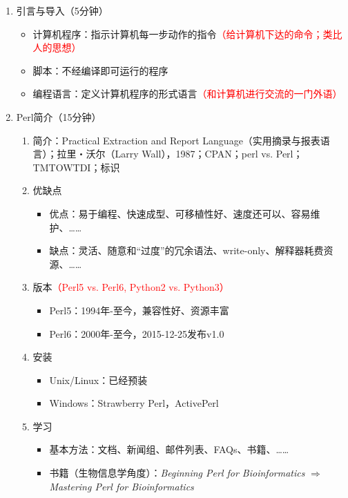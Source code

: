 \documentclass{TIJMUjiaoanLL}
\begin{document}
\begin{enumerate}
  \item 引言与导入（5分钟）
    \begin{itemize}
      \item 计算机程序：指示计算机每一步动作的指令\textcolor{red}{（给计算机下达的命令；类比人的思想）}
      \item 脚本：不经编译即可运行的程序
      \item 编程语言：定义计算机程序的形式语言\textcolor{red}{（和计算机进行交流的一门外语）}
    \end{itemize}
  \item Perl简介（15分钟）
    \begin{enumerate}
      \item 简介：Practical Extraction and Report Language（实用摘录与报表语言）；拉里・沃尔（Larry Wall），1987；CPAN；perl vs. Perl；TMTOWTDI；标识
      \item 优缺点
	\begin{itemize}
	  \item 优点：易于编程、快速成型、可移植性好、速度还可以、容易维护、……
	  \item 缺点：灵活、随意和“过度”的冗余语法、write-only、解释器耗费资源、……
	\end{itemize}
      \item 版本\textcolor{red}{（Perl5 vs. Perl6, Python2 vs. Python3）}
	\begin{itemize}
	  \item Perl5：1994年-至今，兼容性好、资源丰富
	  \item Perl6：2000年-至今，2015-12-25发布v1.0
	\end{itemize}
      \item 安装
	\begin{itemize}
	  \item Unix/Linux：已经预装
	  \item Windows：Strawberry Perl，ActivePerl
	\end{itemize}
      \item 学习
	\begin{itemize}
	  \item 基本方法：文档、新闻组、邮件列表、FAQs、书籍、……
	  \item 书籍（生物信息学角度）：\textit{Beginning Perl for Bioinformatics} $\Rightarrow$ \textit{Mastering Perl for Bioinformatics}

\end{itemize}
\end{enumerate}
\end{enumerate}
\end{document}
